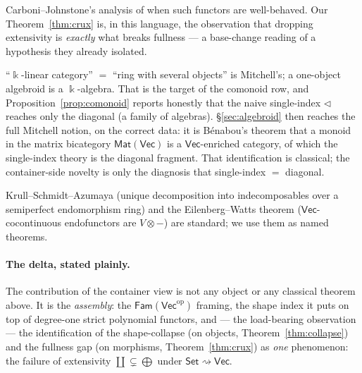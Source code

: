 \documentclass[11pt]{amsart}
\theoremstyle{plain}
\theoremstyle{definition}
\renewcommand{\Vec}{\mathsf{Vec}}
\newcommand{\Set}{\mathsf{Set}}
\newcommand{\Fam}{\mathsf{Fam}}
\newcommand{\Mat}{\mathsf{Mat}}
\newcommand{\op}{\mathrm{op}}
\newcommand{\fld}{\Bbbk}
\newcommand{\bul}{{-}}
\DeclareMathOperator{\dcoprod}{\textstyle\coprod}
\begin{document}
\begin{description}
  Carboni--Johnstone's analysis of when such functors are well-behaved. Our
  Theorem~\ref{thm:crux} is, in this language, the observation that dropping
  extensivity is \emph{exactly} what breaks fullness --- a base-change reading of
  a hypothesis they already isolated.
\item[Algebroids.] ``$\fld$-linear category'' $=$ ``ring with several objects'' is
  Mitchell's; a one-object algebroid is a $\fld$-algebra. That is the target of
  the comonoid row, and Proposition~\ref{prop:comonoid} reports honestly that
  the naive single-index $\lhd$ reaches only the diagonal (a family of algebras).
  \S\ref{sec:algebroid} then reaches the full Mitchell notion, on the correct data:
  it is B\'enabou's theorem that a monoid in the matrix bicategory $\Mat(\Vec)$ is a
  $\Vec$-enriched category, of which the single-index theory is the diagonal
  fragment. That identification is classical; the container-side novelty is only the
  diagnosis that single-index $=$ diagonal.
\item[The classical tools.] Krull--Schmidt--Azumaya (unique decomposition into
  indecomposables over a semiperfect endomorphism ring) and the Eilenberg--Watts
  theorem ($\Vec$-cocontinuous endofunctors are $V\otimes\bul$) are standard;
  we use them as named theorems.
\end{description}

\paragraph{The delta, stated plainly.}
The contribution of the container view is not any object or any classical
theorem above. It is the \emph{assembly}: the $\Fam(\Vec^\op)$ framing, the
shape index it puts on top of degree-one strict polynomial functors, and --- the
load-bearing observation --- the identification of the shape-collapse (on
objects, Theorem~\ref{thm:collapse}) and the fullness gap (on morphisms,
Theorem~\ref{thm:crux}) as \emph{one} phenomenon: the failure of extensivity
$\dcoprod\subsetneq\bigoplus$ under $\Set\rightsquigarrow\Vec$.
\end{document}
